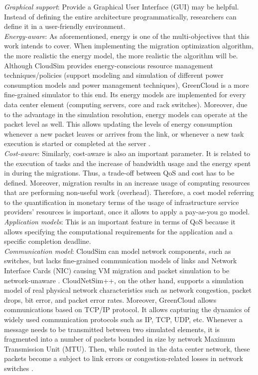 \noindent\tab \textit{Graphical support}: Provide a Graphical User Interface (GUI) may be helpful. Instead of defining the entire architecture programmatically, researchers can define it in a user-friendly environment.\\
\noindent\tab \textit{Energy-aware}: As aforementioned, energy is one of the multi-objectives that this work intends to cover. When implementing the migration optimization algorithm, the more realistic the energy model, the more realistic the algorithm will be. Although CloudSim provides energy-conscious resource management techniques/policies (support modeling
and simulation of different power consumption models and power management techniques), GreenCloud is a more fine-grained simulator to this end. Its energy models are implemented for every data center element (computing servers, core and rack switches). Moreover, due to the advantage in the simulation resolution, energy models can operate at the packet level as well. This allows updating the levels of energy consumption whenever a new packet leaves or arrives from the link, or whenever a new task execution is started or completed at the server \cite{kliazovich2012greencloud}.\\
\noindent\tab \textit{Cost-aware}: Similarly, cost-aware is also an important parameter. It is related to the execution of tasks and the increase of bandwidth usage and the energy spent in during the migrations. Thus, a trade-off between QoS and cost has to be defined. Moreover, migration results in an increase usage of computing resources that are performing non-useful work (overhead). Therefore, a cost model referring to the quantification in monetary terms of the usage of infrastructure service providers' resources is important, once it allows to apply a pay-as-you go model.\\
\noindent\tab \textit{Application models}: This is an important feature in terms of QoS because it allows specifying the computational requirements for the application and a specific completion deadline.\\
\noindent\tab \textit{Communication model}: CloudSim can model network components, such as switches, but lacks fine-grained communication models of links and Network Interface Cards (NIC) causing VM migration and packet simulation to be network-unaware \cite{malik2017cloudnetsim++}. CloudNetSim++, on the other hand, supports a simulation model of real physical network characteristics such as network congestion, packet drops, bit error, and packet error rates. Moreover, GreenCloud allows communications based on TCP/IP protocol. It allows capturing the dynamics of widely used communication protocols such as IP, TCP, UDP, etc. Whenever a message needs to be transmitted between two simulated elements, it is fragmented into a number of packets bounded in size by network Maximum Transmission Unit (MTU). Then, while routed in the data center network, these packets become a subject to link errors or congestion-related losses in network switches \cite{kliazovich2012greencloud}.\\
